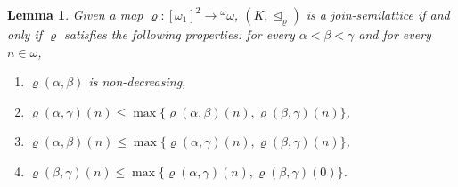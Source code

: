\documentclass[]{amsart}
\newtheorem{lemma}[theorem]{Lemma}
\theoremstyle{definition}
\theoremstyle{remark}
\begin{document}
\begin{lemma}\label{lemma:Kjoin}
Given a map $\varrho:[\omega_1]^2 \rightarrow {}^\omega \omega$, $(K, \trianglelefteq_\varrho)$ is a join-semilattice if and only if $\varrho$ satisfies the following properties: for every $\alpha < \beta < \gamma$ and for every $n\in\omega$,
\begin{enumerate}[label={\upshape ($\varrho$\arabic*)}]
\item $\varrho(\alpha, \beta)$ is non-decreasing,
\item $\varrho(\alpha, \gamma)(n) \le \max \{\varrho(\alpha, \beta)(n), \varrho(\beta, \gamma)(n)\}$,
\item $\varrho(\alpha, \beta)(n) \le \max \{\varrho(\alpha, \gamma)(n), \varrho(\beta, \gamma)(n)\}$,
\item $\varrho(\beta, \gamma)(n) \le \max \{\varrho(\alpha, \gamma)(n), \varrho(\beta, \gamma)(0)\}$.
\end{enumerate}
\end{lemma}
\end{document}
